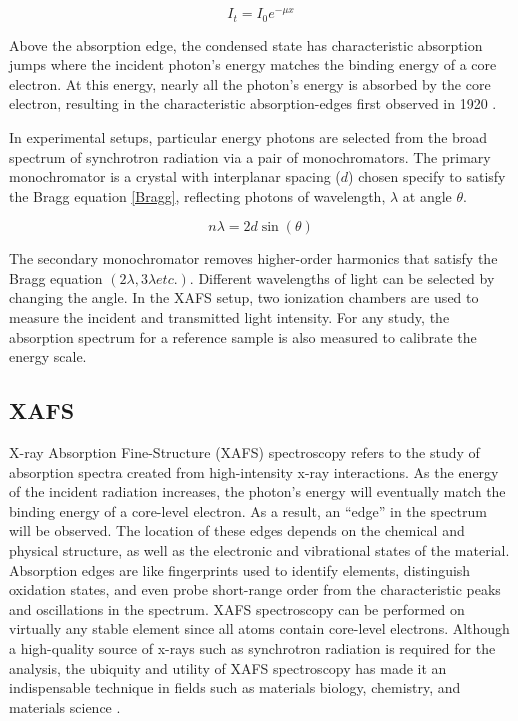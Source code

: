 \begin{equation}
    \label{BeerLambert}
    I_t = I_0 e^{-\mu x}
\end{equation}

Above the absorption edge, the condensed state has characteristic absorption jumps where the incident photon's energy matches the binding energy of a core electron. At this energy, nearly all the photon's energy is absorbed by the core electron, resulting in the characteristic absorption-edges first observed in 1920 \cite{fricke1920, hertz1920ueber}.

In experimental setups, particular energy photons are selected from the broad spectrum of synchrotron radiation via a pair of monochromators. The primary monochromator is a crystal with interplanar spacing ($ d $) chosen specify to satisfy the Bragg equation \ref{Bragg}, reflecting photons of wavelength, $ \lambda $ at angle $ \theta $.  

\begin{equation}
    \label{Bragg}
    n\lambda = 2d\sin(\theta)
\end{equation}

The secondary monochromator removes higher-order harmonics that satisfy the Bragg equation $ (2\lambda, 3\lambda etc.). $ Different wavelengths of light can be selected by changing the angle. In the XAFS setup, two ionization chambers are used to measure the incident and transmitted light intensity. For any study, the absorption spectrum for a reference sample is also measured to calibrate the energy scale.


\subsection{XAFS}
X-ray Absorption Fine-Structure (XAFS) spectroscopy refers to the study of absorption spectra created from high-intensity x-ray interactions. As the energy of the incident radiation increases, the photon's energy will eventually match the binding energy of a core-level electron. As a result, an ``edge'' in the spectrum will be observed. The location of these edges depends on the chemical and physical structure, as well as the electronic and vibrational states of the material. Absorption edges are like fingerprints used to identify elements, distinguish oxidation states, and even probe short-range order from the characteristic peaks and oscillations in the spectrum. XAFS spectroscopy can be performed on virtually any stable element since all atoms contain core-level electrons. Although a high-quality source of x-rays such as synchrotron radiation is required for the analysis, the ubiquity and utility of XAFS spectroscopy has made it an indispensable technique in fields such as materials biology, chemistry, and materials science \cite{rehrXAFS2000review} \cite{newville2014fundamentals}.

